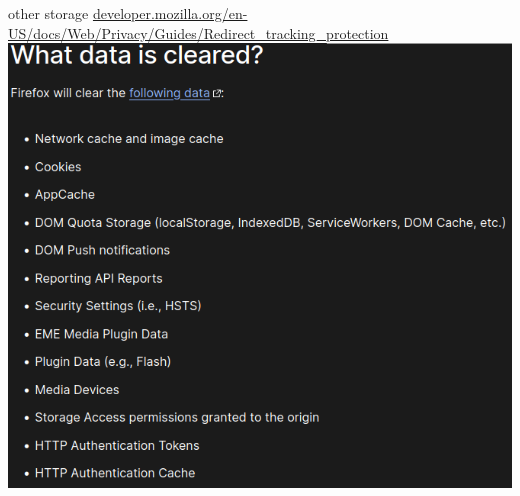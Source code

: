 \begin{frame}{other storage}
{\scriptsize\url{developer.mozilla.org/en-US/docs/Web/Privacy/Guides/Redirect_tracking_protection}}
\includegraphics[height=0.8\textheight]{../web/ff-redirect-clears}
\end{frame}
